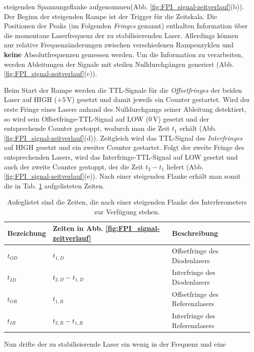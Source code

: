 steigenden Spannungsflanke aufgenommen(Abb.
\ref{fig:FPI_signal-zeitverlauf}(b)). Der Beginn der steigenden Rampe ist der
Trigger für die Zeitskala. Die Positionen der Peaks (im Folgenden
\textit{Fringes} genannt) enthalten Information über die momentane
Laserfrequenz der zu stabilisierenden Laser. Allerdings können nur relative
Frequenzänderungen zwischen verschiedenen Rampenzyklen und \textbf{keine}
Absolutfrequenzen gemessen werden. Um die Information zu verarbeiten, werden Ableitungen der Signale mit
steilen Nulldurchgängen generiert (Abb.
\ref{fig:FPI_signal-zeitverlauf}(c)).\par
Beim Start der Rampe werden die TTL-Signale für die \textit{Offsetfringes} der
beiden Laser auf HIGH ($+5\,$V) gesetzt und damit jeweils ein Counter gestartet.
Wird der erste Fringe eines Lasers anhand des Nulldurchgangs seiner Ableitung
detektiert, so wird sein Offsetfringe-TTL-Signal auf LOW ($0\,$V) gesetzt und der
entsprechende Counter gestoppt, wodurch man die Zeit $t_1$ erhält (Abb.
\ref{fig:FPI_signal-zeitverlauf}(d)). Zeitgleich wird das TTL-Signal des
\textit{Interfringes} auf HIGH gesetzt und ein zweiter Counter gestartet.
Folgt der zweite Fringe des entsprechenden Lasers, wird das
Interfringe-TTL-Signal auf LOW gesetzt und auch der zweite Counter gestoppt,
der die Zeit $t_2-t_1$ liefert (Abb. \ref{fig:FPI_signal-zeitverlauf}(e)). Nach
einer steigenden Flanke erhält man somit die in Tab. \ref{tab:laserzeiten}
aufgelisteten Zeiten.\par
\begin{table}
	\begin{tabular}{p{}p{}p{}}
		\toprule
		Bezeichung & Zeiten in Abb. \ref{fig:FPI_signal-zeitverlauf} & Beschreibung \\
		\midrule[1px]
		\hline
		$t_{OD}$ & $t_{1,D}$ & Offsetfringe des Diodenlasers \\
		$t_{ID}$ & $t_{2,D}-t_{1,D}$ & Interfringe des Diodenlasers \\
		$t_{OR}$ & $t_{1,R}$ & Offsetfringe des Referenzlasers \\
		$t_{IR}$ & $t_{2,R}-t_{1,R}$ & Interfringe des Referenzlasers \\
		\bottomrule[1px]
	\end{tabular}
	\caption[Fringezeiten]{Aufeglistet sind die Zeiten, die nach einer steigenden
	Flanke des Interferometers zur Verfügung stehen.}
	\label{tab:laserzeiten}
\end{table}
Nun drifte der zu stabilisierende Laser ein wenig in der Frequenz und eine
